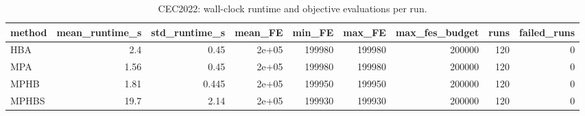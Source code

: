 \begin{table}[t]
\centering
\scriptsize
\caption{CEC2022: wall-clock runtime and objective evaluations per run.}
\label{tab:cec2022_runtime}
\begin{tabular}{lrrrrrrrr}
\toprule
method & mean\_runtime\_s & std\_runtime\_s & mean\_FE & min\_FE & max\_FE & max\_fes\_budget & runs & failed\_runs \\
\midrule
HBA & 2.4 & 0.45 & 2e+05 & 199980 & 199980 & 200000 & 120 & 0 \\
MPA & 1.56 & 0.45 & 2e+05 & 199980 & 199980 & 200000 & 120 & 0 \\
MPHB & 1.81 & 0.445 & 2e+05 & 199950 & 199950 & 200000 & 120 & 0 \\
MPHBS & 19.7 & 2.14 & 2e+05 & 199930 & 199930 & 200000 & 120 & 0 \\
\bottomrule
\end{tabular}
\end{table}
